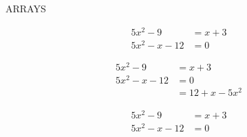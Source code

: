 \documentclass[11pt]{article}
\begin{document}
\begin{comment}
This is a Comment
It works!
This is a Multiline comment
\end{comment}

ARRAYS
\vspace{2cm}

\begin{align}
5x^2-9&=x+3\\
5x^2-x-12&=0
\end{align}

\begin{align*}
5x^2-9&=x+3\\
5x^2-x-12&=0\\
&=12+x-5x^2
\end{align*}

\begin{align}
5x^2-9&=x+3\\
5x^2-x-12&=0
\end{align}
\end{document}
